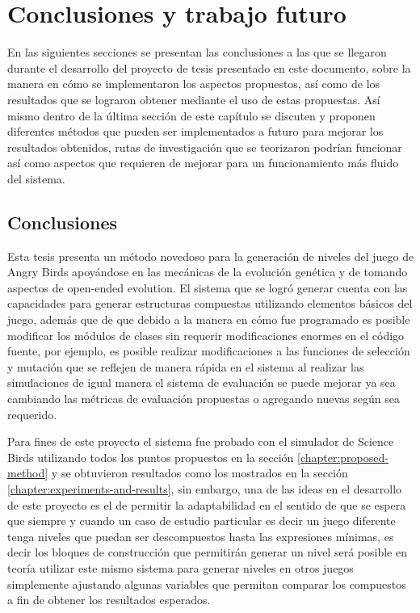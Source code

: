 \chapter{Conclusiones y trabajo futuro}
\label{chapter:conclusions-and-future-work}

En las siguientes secciones se presentan las conclusiones a las que se llegaron
durante el desarrollo del proyecto de tesis presentado en este documento, sobre
la manera en cómo se implementaron los aspectos propuestos, así como de los
resultados que se lograron obtener mediante el uso de estas propuestas. Así
mismo dentro de la última sección de este capítulo se discuten y proponen
diferentes métodos que pueden ser implementados a futuro para mejorar los
resultados obtenidos, rutas de investigación que se teorizaron podrían funcionar
así como aspectos que requieren de mejorar para un funcionamiento más fluido del
sistema.

\section{Conclusiones}
\label{section:conclusions}

Esta tesis presenta un método novedoso para la generación de niveles del juego de
Angry Birds apoyándose en las mecánicas de la evolución genética y de tomando
aspectos de open-ended evolution. El sistema que se logró generar cuenta con las
capacidades para generar estructuras compuestas utilizando elementos básicos del
juego, además que de que debido a la manera en cómo fue programado es posible
modificar los módulos de clases sin requerir modificaciones enormes en el código
fuente, por ejemplo, es posible realizar modificaciones a las funciones de
selección y mutación que se reflejen de manera rápida en el sistema al realizar
las simulaciones de igual manera el sistema de evaluación se puede mejorar ya
sea cambiando las métricas de evaluación propuestas o agregando nuevas según sea
requerido.

Para fines de este proyecto el sistema fue probado con el simulador de Science
Birds utilizando todos los puntos propuestos en la sección
\ref{chapter:proposed-method} y se obtuvieron resultados como los mostrados en
la sección \ref{chapter:experiments-and-results}, sin embargo, una de las ideas
en el desarrollo de este proyecto es el de permitir la adaptabilidad en el
sentido de que se espera que siempre y cuando un caso de estudio particular es
decir un juego diferente tenga niveles que puedan ser descompuestos hasta las
expresiones mínimas, es decir los bloques de construcción que permitirán generar
un nivel será posible en teoría utilizar este mismo sistema para generar niveles
en otros juegos simplemente ajustando algunas variables que permitan comparar
los compuestos a fin de obtener los resultados esperados.

